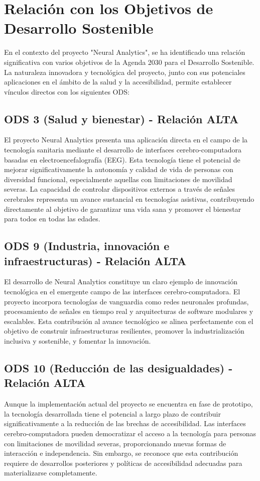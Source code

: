 \newpage

\section*{Relación con los Objetivos de Desarrollo Sostenible}

En el contexto del proyecto "Neural Analytics", se ha identificado una relación significativa con varios objetivos de la Agenda 2030 para el Desarrollo Sostenible. La naturaleza innovadora y tecnológica del proyecto, junto con sus potenciales aplicaciones en el ámbito de la salud y la accesibilidad, permite establecer vínculos directos con los siguientes ODS:

\subsection*{ODS 3 (Salud y bienestar) - Relación ALTA}

El proyecto Neural Analytics presenta una aplicación directa en el campo de la tecnología sanitaria mediante el desarrollo de interfaces cerebro-computadora basadas en electroencefalografía (EEG). Esta tecnología tiene el potencial de mejorar significativamente la autonomía y calidad de vida de personas con diversidad funcional, especialmente aquellas con limitaciones de movilidad severas. La capacidad de controlar dispositivos externos a través de señales cerebrales representa un avance sustancial en tecnologías asistivas, contribuyendo directamente al objetivo de garantizar una vida sana y promover el bienestar para todos en todas las edades.

\subsection*{ODS 9 (Industria, innovación e infraestructuras) - Relación ALTA}

El desarrollo de Neural Analytics constituye un claro ejemplo de innovación tecnológica en el emergente campo de las interfaces cerebro-computadora. El proyecto incorpora tecnologías de vanguardia como redes neuronales profundas, procesamiento de señales en tiempo real y arquitecturas de software modulares y escalables. Esta contribución al avance tecnológico se alinea perfectamente con el objetivo de construir infraestructuras resilientes, promover la industrialización inclusiva y sostenible, y fomentar la innovación.

\subsection*{ODS 10 (Reducción de las desigualdades) - Relación ALTA}

Aunque la implementación actual del proyecto se encuentra en fase de prototipo, la tecnología desarrollada tiene el potencial a largo plazo de contribuir significativamente a la reducción de las brechas de accesibilidad. Las interfaces cerebro-computadora pueden democratizar el acceso a la tecnología para personas con limitaciones de movilidad severas, proporcionando nuevas formas de interacción e independencia. Sin embargo, se reconoce que esta contribución requiere de desarrollos posteriores y políticas de accesibilidad adecuadas para materializarse completamente.


